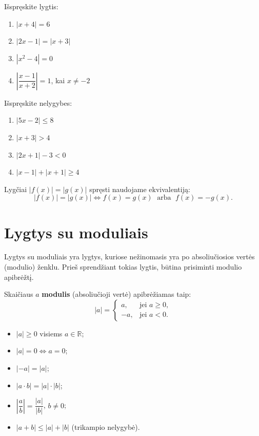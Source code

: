 \begin{exercise}
Išspręskite lygtis:
\begin{enumerate}[label=\arabic*.]
    \item $|x + 4| = 6$
    \item $|2x - 1| = |x + 3|$
    \item $|x^2 - 4| = 0$
    \item $\left|\dfrac{x-1}{x+2}\right| = 1$, kai $x \neq -2$
\end{enumerate}
\end{exercise}

\begin{exercise}
Išspręskite nelygybes:
\begin{enumerate}[label=\arabic*.]
    \item $|5x - 2| \leq 8$
    \item $|x + 3| > 4$
    \item $|2x + 1| - 3 < 0$
    \item $|x - 1| + |x + 1| \geq 4$
\end{enumerate}
\end{exercise}

\begin{remark}
Lygčiai $|f(x)| = |g(x)|$ spręsti naudojame ekvivalentiją:
\[
|f(x)| = |g(x)| \iff f(x) = g(x) \;\text{ arba }\; f(x) = -g(x).
\]
\end{remark}

\section{Lygtys su moduliais}

Lygtys su moduliais yra lygtys, kuriose nežinomasis yra po absoliučiosios vertės (modulio) ženklu. Prieš sprendžiant tokias lygtis, būtina prisiminti modulio apibrėžtį.

\begin{definition}
Skaičiaus $a$ \textbf{modulis} (absoliučioji vertė) apibrėžiamas taip:
\[
|a| = \begin{cases} a, & \text{jei } a \geq 0, \\ -a, & \text{jei } a < 0. \end{cases}
\]
\end{definition}

\begin{tcolorbox}[colback=blue!5!white, colframe=blue!60!black, title=Pagrindinės modulio savybės]
\begin{itemize}
    \item $|a| \geq 0$ visiems $a \in \mathbb{R}$;
    \item $|a| = 0 \iff a = 0$;
    \item $|-a| = |a|$;
    \item $|a \cdot b| = |a| \cdot |b|$;
    \item $\left|\dfrac{a}{b}\right| = \dfrac{|a|}{|b|}$, $b \neq 0$;
    \item $|a + b| \leq |a| + |b|$ \quad (trikampio nelygybė).
\end{itemize}
\end{tcolorbox}

